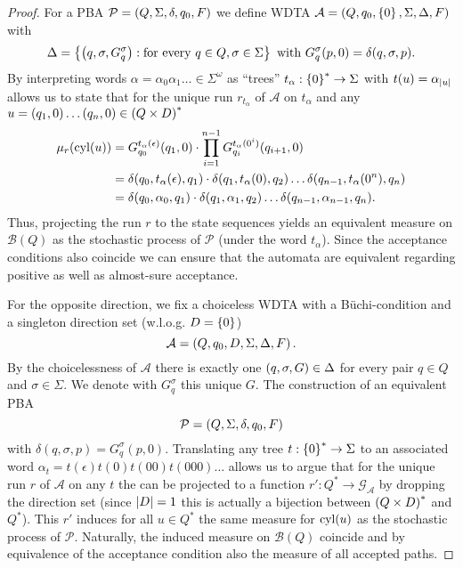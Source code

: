 \begin{proof}
  For a \ac{PBA} $\mathcal{P} = \left(Q, \Sigma, \delta, q_{0}, F\right)$ we define
  \ac{WDTA} $\mathcal{A} = \left(Q, q_{0}, \left\{0\right\}, \Sigma, \Delta, F\right)$ with
  \begin{equation*}
    \Delta = \left\{
      \left(q,\sigma,G_{q}^{\sigma}\right):\text{for every }q\in Q,\sigma\in\Sigma
    \right\}\text{ with }G_{q}^{\sigma}(p, 0) = \delta(q,\sigma,p).
  \end{equation*}
  By interpreting words $\alpha = \alpha_{0}\alpha_{1}\dots\in\Sigma^{\omega}$
  as \enquote{trees} $t_{\alpha}:\left\{0\right\}^{*}\rightarrow\Sigma$ with 
  $t(u) = \alpha_{\left\vert{u}\right\vert}$ allows us to state that for the unique run 
  $r_{t_{\alpha}}$ of $\mathcal{A}$ on $t_{\alpha}$ and any 
  $u = \left(q_{1}, 0\right)\dots\left(q_{n}, 0\right)\in\left(Q\times D\right)^{*}$
  \begin{align*}
    \mu_{r}(\operatorname{cyl}(u)) &= G_{q_{0}}^{t_{\alpha}(\epsilon)}(q_{1},0)\cdot
      \prod\limits_{i=1}^{n-1}G_{q_{i}}^{t_{\alpha}(0^{i})}(q_{i+1}, 0)\\
      &=\delta(q_{0},t_{\alpha}(\epsilon),q_{1})\cdot
      \delta(q_{1},t_{\alpha}(0),q_{2})\dots
        \delta(q_{n-1},t_{\alpha}(0^{n}),q_{n})\\
      &=\delta(q_{0},\alpha_{0},q_{1})\cdot
      \delta(q_{1},\alpha_{1},q_{2})\dots\delta(q_{n-1},\alpha_{n-1},q_{n}).
  \end{align*}
  Thus, projecting the run $r$ to the state sequences yields an equivalent 
  measure on $\mathcal{B}(Q)$ as the stochastic process of $\mathcal{P}$ (under
  the word $t_{\alpha}$). Since the acceptance conditions also coincide we can 
  ensure that the automata are equivalent regarding positive as well as 
  almost-sure acceptance.

  For the opposite direction, we fix a choiceless \ac{WDTA} with a 
  Büchi-condition and a singleton direction set (w.l.o.g. $D = \left\{0\right\}$)
  \begin{equation*}
    \mathcal{A} = \left(Q, q_{0}, D , \Sigma, \Delta, F\right).
  \end{equation*}
  By the choicelessness of $\mathcal{A}$ there is exactly one 
  $\left(q,\sigma, G\right)\in\Delta$ for every pair $q\in Q$ and $\sigma\in\Sigma$.
  We denote with $G_{q}^{\sigma}$ this unique $G$. The construction of an
  equivalent \ac{PBA}
  \begin{equation*}
    \mathcal{P} = \left(Q, \Sigma, \delta, q_{0}, F\right)
  \end{equation*}
  with $\delta(q,\sigma, p) = G_{q}^{\sigma}(p, 0)$. Translating any tree
  $t:\left\{0\right\}^{*}\rightarrow\Sigma$ to an associated word 
  $\alpha_{t} = t(\epsilon)t(0)t(00)t(000)\dots$ allows us to argue that for 
  the unique run $r$ of $\mathcal{A}$ on any $t$ the can be projected to a 
  function $r':Q^{*}\rightarrow\mathcal{G}_{\mathcal{A}}$ by dropping the 
  direction set (since $\left\vert{D}\right\vert = 1$ this is actually a bijection between
  $\left(Q\times D\right)^{*}$ and $Q^{*}$). This $r'$ induces for all $u\in Q^{*}$
  the same measure for $\operatorname{cyl}(u)$ as the stochastic process of $\mathcal{P}$.
  Naturally, the induced measure on $\mathcal{B}(Q)$ coincide and by 
  equivalence of the acceptance condition also the measure of all accepted 
  paths.
\end{proof}
